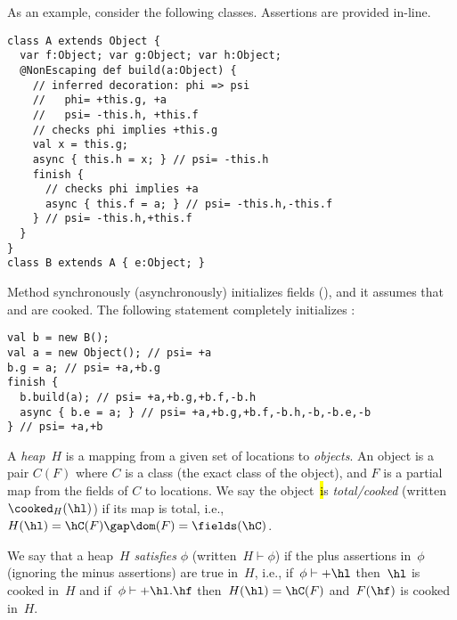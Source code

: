 As an example, consider the following classes. Assertions are provided
in-line.
\vspace{-0.2cm}\begin{lstlisting}
class A extends Object {
  var f:Object; var g:Object; var h:Object;
  @NonEscaping def build(a:Object) {
    // inferred decoration: phi => psi
    //   phi= +this.g, +a
    //   psi= -this.h, +this.f
    // checks phi implies +this.g
    val x = this.g;
    async { this.h = x; } // psi= -this.h
    finish {
      // checks phi implies +a
      async { this.f = a; } // psi= -this.h,-this.f
    } // psi= -this.h,+this.f
  }
}
class B extends A { e:Object; }
\end{lstlisting}\vspace{-0.2cm}
Method  synchronously (asynchronously) initializes fields  (),
    and it assumes that  and  are cooked.
The following statement completely initializes :
\vspace{-0.2cm}\begin{lstlisting}
val b = new B();
val a = new Object(); // psi= +a
b.g = a; // psi= +a,+b.g
finish {
  b.build(a); // psi= +a,+b.g,+b.f,-b.h
  async { b.e = a; } // psi= +a,+b.g,+b.f,-b.h,-b,-b.e,-b
} // psi= +a,+b
\end{lstlisting}\vspace{-0.2cm}


A {\em heap}~$H$ is a mapping from a given set of locations to {\em
  objects}. An object is a pair $C(F)$ where $C$ is a class (the exact
class of the object), and $F$ is a partial map from the fields of $C$
to locations.
We say the object~\hl is {\em total/cooked} (written~$\cooked_H(\hl)$)
    if its map is total, i.e.,~$H(\hl)=\hC(F) \gap \dom(F)=\fields(\hC)$.

We say that a heap~$H$ {\em satisfies} $\phi$ (written~$H \vdash \phi$)
    if the plus assertions in~$\phi$ (ignoring the minus assertions) are true in~$H$,
    i.e., if~$\phi \vdash +\hl$ then~$\hl$ is cooked in~$H$
    and if~$\phi \vdash +\hl.\hf$ then~$H(\hl)=\hC(F)$ and~$F(\hf)$ is cooked in~$H$.



